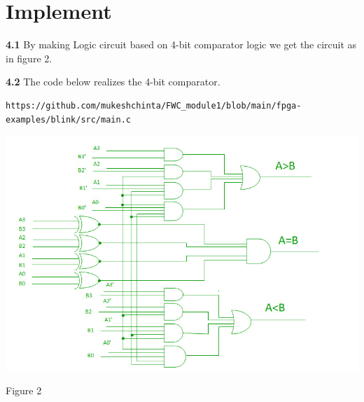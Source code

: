 \documentclass[10pt, a4paper]{article}
\begin{document}
\section{Implement}
\textbf{4.1}
By making Logic circuit based on 4-bit comparator logic we get the circuit as in figure 2.

\textbf{4.2}
The code below realizes the 4-bit comparator.
\begin{lstlisting}
https://github.com/mukeshchinta/FWC_module1/blob/main/fpga-examples/blink/src/main.c
\end{lstlisting}

 \begin{center}
\includegraphics[scale=.40]{4bit.jpg}

\end{center}
\begin{center}
    Figure 2
\end{center}
\end{document}
